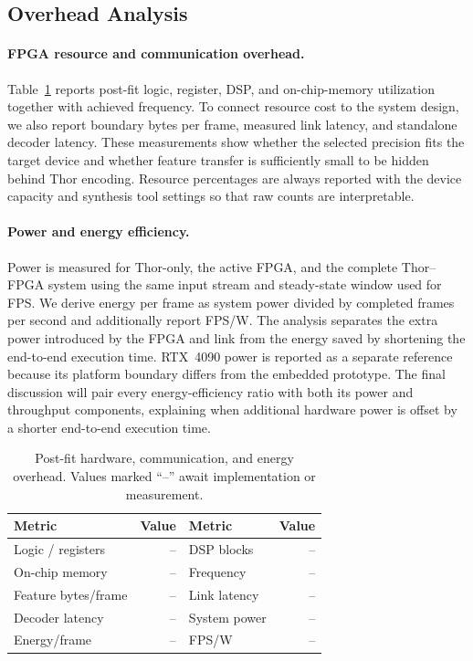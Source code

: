\subsection{Overhead Analysis}

\paragraph{FPGA resource and communication overhead.}
Table~\ref{tab:hardware-overhead} reports post-fit logic, register, DSP, and
on-chip-memory utilization together with achieved frequency.  To connect
resource cost to the system design, we also report boundary bytes per frame,
measured link latency, and standalone decoder latency.  These measurements
show whether the selected precision fits the target device and whether feature
transfer is sufficiently small to be hidden behind Thor encoding.  Resource
percentages are always reported with the device capacity and synthesis tool
settings so that raw counts are interpretable.

\paragraph{Power and energy efficiency.}
Power is measured for Thor-only, the active FPGA, and the complete
Thor--FPGA system using the same input stream and steady-state window used for
FPS.  We derive energy per frame as system power divided by completed frames
per second and additionally report FPS/W.  The analysis separates the extra
power introduced by the FPGA and link from the energy saved by shortening the
end-to-end execution time.  RTX~4090 power is reported as a separate reference
because its platform boundary differs from the embedded prototype.  The final
discussion will pair every energy-efficiency ratio with both its power and
throughput components, explaining when additional hardware power is offset by
a shorter end-to-end execution time.

\begin{table}[t]
  \caption{Post-fit hardware, communication, and energy overhead.  Values
  marked ``--'' await implementation or measurement.}
  \label{tab:hardware-overhead}
  \centering
  \small
  \setlength{\tabcolsep}{3.0pt}
  \renewcommand{\arraystretch}{1.08}
  \begin{tabular}{lr@{\qquad}lr}
    \toprule
    Metric & Value & Metric & Value \\
    \midrule
    Logic / registers & -- & DSP blocks & -- \\
    On-chip memory & -- & Frequency & -- \\
    Feature bytes/frame & -- & Link latency & -- \\
    Decoder latency & -- & System power & -- \\
    Energy/frame & -- & FPS/W & -- \\
    \bottomrule
  \end{tabular}
\end{table}
